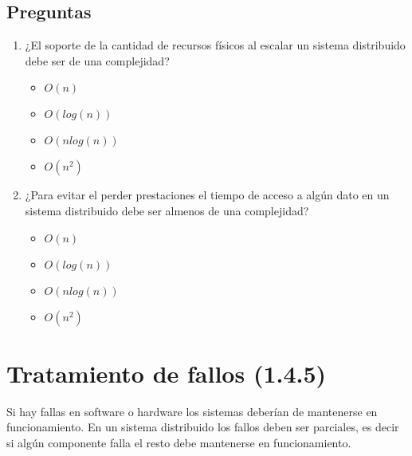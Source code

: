 \section{Preguntas}
\begin{enumerate}
    \item { ¿El soporte de la cantidad de recursos físicos al escalar un sistema distribuido debe ser de una complejidad? 
            \begin{itemize}
                \item {\textbf{$O(n)$}}
                \item {$O(log(n))$}
                \item {$O(nlog(n))$}
                \item {$O(n^{2})$}
            \end{itemize}
            }
    \item { ¿Para evitar el perder prestaciones el tiempo de acceso a algún dato en un sistema distribuido debe ser almenos de una complejidad? 
            \begin{itemize}
                \item {$O(n)$}
                \item {\textbf{ $O(log(n))$ } }
                \item {$O(nlog(n))$}
                \item {$O(n^{2})$}
            \end{itemize}
            }
\end{enumerate}

\chapter{Tratamiento de fallos (1.4.5)}
Si hay fallas en software o hardware los sistemas deberían de mantenerse en funcionamiento. En un sistema distribuido los fallos deben ser parciales, es decir si algún componente falla el resto debe mantenerse en funcionamiento.

